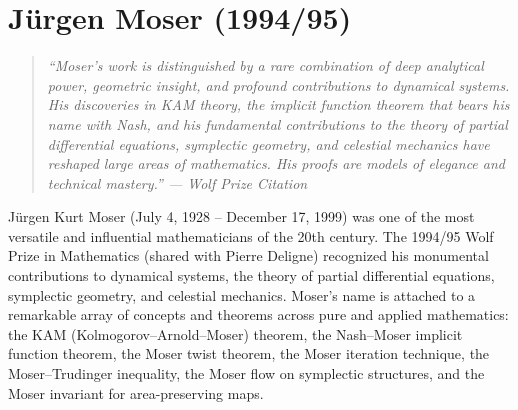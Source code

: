 \let\R\relax
\newcommand{\R}{\mathbb{R}}
\let\C\relax
\newcommand{\C}{\mathbb{C}}
\let\N\relax
\newcommand{\N}{\mathbb{N}}
\let\Z\relax
\newcommand{\Z}{\mathbb{Z}}
\let\Q\relax
\newcommand{\Q}{\mathbb{Q}}
\let\SO\relax
\newcommand{\SO}{\operatorname{SO}}
\let\SL\relax
\newcommand{\SL}{\operatorname{SL}}
\let\GL\relax
\newcommand{\GL}{\operatorname{GL}}
\let\St\relax
\newcommand{\St}{\operatorname{St}}
\let\GV\relax
\newcommand{\GV}{\operatorname{GV}}
\let\E\relax
\newcommand{\E}{\operatorname{E}}
\let\Diff\relax
\newcommand{\Diff}{\operatorname{Diff}}
\let\Symp\relax
\newcommand{\Symp}{\operatorname{Symp}}
\let\Ham\relax
\newcommand{\Ham}{\operatorname{Ham}}
\let\Spec\relax
\newcommand{\Spec}{\operatorname{Spec}}
\let\Ker\relax
\newcommand{\Ker}{\operatorname{Ker}}
\let\vol\relax
\newcommand{\vol}{\operatorname{vol}}
\let\diam\relax
\newcommand{\diam}{\operatorname{diam}}
\let\area\relax
\newcommand{\area}{\operatorname{area}}
\let\Image\relax
\newcommand{\Image}{\operatorname{Im}}
\let\Lip\relax
\newcommand{\Lip}{\operatorname{Lip}}
\let\id\relax
\newcommand{\id}{\operatorname{id}}
\let\supp\relax
\newcommand{\supp}{\operatorname{supp}}
\let\const\relax
\newcommand{\const}{\operatorname{const}}

\chapter{J\"{u}rgen Moser (1994/95)}

\begin{quote}
\it ``Moser's work is distinguished by a rare combination of deep analytical power, geometric insight, and profound contributions to dynamical systems. His discoveries in KAM theory, the implicit function theorem that bears his name with Nash, and his fundamental contributions to the theory of partial differential equations, symplectic geometry, and celestial mechanics have reshaped large areas of mathematics. His proofs are models of elegance and technical mastery.'' --- Wolf Prize Citation
\end{quote}

J\"{u}rgen Kurt Moser (July 4, 1928 -- December 17, 1999) was one of the most versatile and influential mathematicians of the 20th century. The 1994/95 Wolf Prize in Mathematics (shared with Pierre Deligne) recognized his monumental contributions to dynamical systems, the theory of partial differential equations, symplectic geometry, and celestial mechanics. Moser's name is attached to a remarkable array of concepts and theorems across pure and applied mathematics: the KAM (Kolmogorov--Arnold--Moser) theorem, the Nash--Moser implicit function theorem, the Moser twist theorem, the Moser iteration technique, the Moser--Trudinger inequality, the Moser flow on symplectic structures, and the Moser invariant for area-preserving maps.

